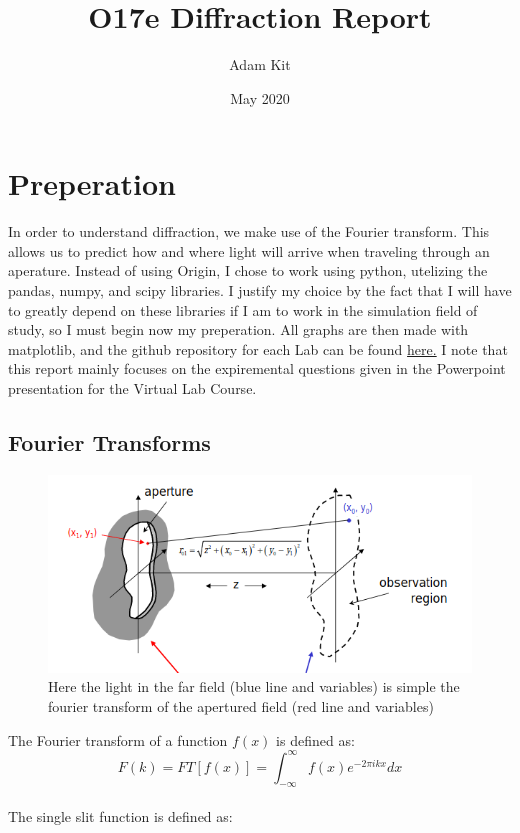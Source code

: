 \documentclass{article}
\title{O17e Diffraction Report}
\author{Adam Kit}
\date{May 2020}
\begin{document}
\maketitle

\section{Preperation}
In order to understand diffraction, we make use of the Fourier transform. This allows us to predict how and where light will arrive when traveling through an aperature. Instead of using Origin, I chose to work using python, utelizing the pandas, numpy, and scipy libraries. I justify my choice by the fact that I will have to greatly depend on these libraries if I am to work in the simulation field of study, so I must begin now my preperation. All graphs are then made with matplotlib, and the github repository for each Lab can be found  \href{https://github.com/fusionby2030/Numerical_Methods/tree/master/Labs/017E}{here.} I note that this report mainly focuses on the expiremental questions given in the Powerpoint presentation for the Virtual Lab Course.\\
\subsection{Fourier Transforms}

\begin{figure}[h]
  \includegraphics[scale=0.5]{fraunhofferdiffraction.png}
  \caption{Here the light in the far field (blue line and variables) is simple the fourier transform of the apertured field (red line and variables)}
\end{figure}


The Fourier transform of a function $f(x)$ is defined as:
$$ F(k) = FT[f(x)]=\int_{-\infty}^{\infty}f(x)e^{-2\pi ikx} dx$$
\\
The single slit function is defined as:
\end{document}
